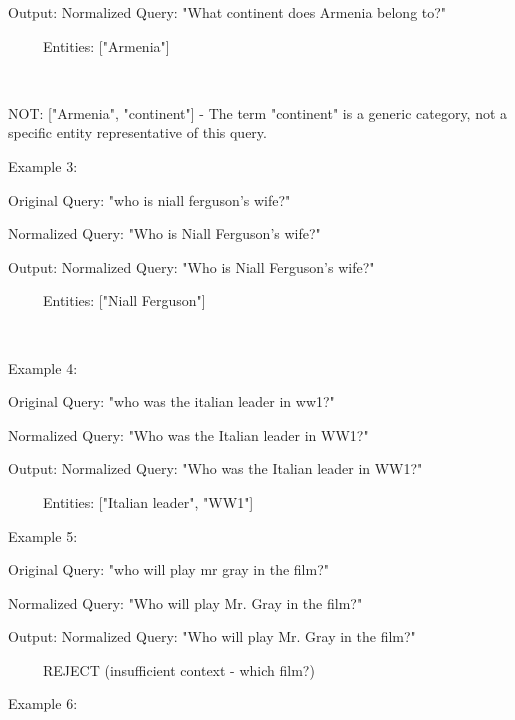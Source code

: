 \begin{tcolorbox}[breakable,title=Prompt Used by the GPT-4o for Data Filtering]
Output: Normalized Query: "What continent does Armenia belong to?"



      Entities: ["Armenia"]

      

NOT: ["Armenia", "continent"] - The term "continent" is a generic category, not a specific entity representative of this query.





Example 3:



Original Query: "who is niall ferguson's wife?"



Normalized Query: "Who is Niall Ferguson's wife?"



Output: Normalized Query: "Who is Niall Ferguson's wife?"



      Entities: ["Niall Ferguson"]

      



Example 4:



Original Query: "who was the italian leader in ww1?"



Normalized Query: "Who was the Italian leader in WW1?"



Output: Normalized Query: "Who was the Italian leader in WW1?"



      Entities: ["Italian leader", "WW1"]



Example 5:



Original Query: "who will play mr gray in the film?"



Normalized Query: "Who will play Mr. Gray in the film?"



Output: Normalized Query: "Who will play Mr. Gray in the film?"



      REJECT (insufficient context - which film?)





Example 6:




\end{tcolorbox}
